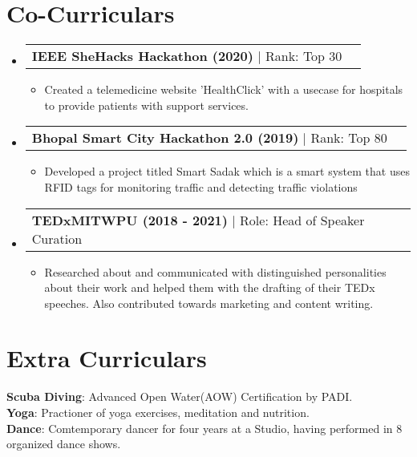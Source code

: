 \documentclass[letterpaper,11pt]{article}
\makeatletter
\newcommand{\resumeItem}[1]{
  \item\small{
    {#1 \vspace{-2pt}}
  }
}
\newcommand{\resumeProjectHeading}[2]{
    \item
    \begin{tabular*}{0.97\textwidth}{l@{\extracolsep{\fill}}r}
      \small#1 & #2 \\
    \end{tabular*}\vspace{-7pt}
}
\newcommand{\resumeSubHeadingListStart}{\begin{itemize}[leftmargin=0.15in, label={}]}
\newcommand{\resumeSubHeadingListEnd}{\end{itemize}}
\newcommand{\resumeItemListStart}{\begin{itemize}}
\newcommand{\resumeItemListEnd}{\end{itemize}\vspace{-5pt}}
\makeatother
\begin{document}
\section{Co-Curriculars}

    \resumeSubHeadingListStart
    
      \resumeProjectHeading
      {\textbf{IEEE SheHacks Hackathon (2020)} $|$ {Rank: Top 30}}{}
      \resumeItemListStart
        \resumeItem{Created a telemedicine website 'HealthClick' with a usecase for hospitals to provide patients with support services.}
      \resumeItemListEnd
      
      \resumeProjectHeading
      {\textbf{Bhopal Smart City Hackathon 2.0 (2019)} $|$ {Rank: Top 80}}{}
      \resumeItemListStart
        \resumeItem{Developed a project titled Smart Sadak which is a smart system that uses RFID tags
        for monitoring traffic and detecting traffic violations}
      \resumeItemListEnd
      
      \resumeProjectHeading
      {\textbf{TEDxMITWPU (2018 - 2021)} $|$ {Role: Head of Speaker Curation}}{}
      \resumeItemListStart
        \resumeItem{Researched about and communicated with distinguished personalities about their work and helped them with the drafting of their TEDx speeches. Also contributed towards marketing and content writing.}
      \resumeItemListEnd

    \resumeSubHeadingListEnd
    
\section{Extra Curriculars}
\smallskip
\begin{itemize}[leftmargin=0.15in, label={}]
    \small{\item{
     \textbf{Scuba Diving}{: Advanced Open Water(AOW) Certification by PADI.} \\
     \textbf{Yoga}{: Practioner of yoga exercises, meditation and nutrition.} \\
     \textbf{Dance}{: Comtemporary dancer for four years at a Studio, having performed in 8 organized dance shows.}
    }}
 \end{itemize}
 
\end{document}
